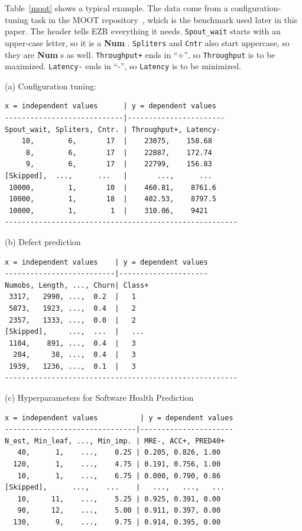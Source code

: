 \documentclass[AMA,STIX2COL]{WileyNJDv5}
\newcommand{\IT}{{\sffamily EZR}}
\newcommand{\cls}[1]{%
  \setlength{\fboxsep}{1.5pt}%
  \colorbox{clsbg}{\sffamily\bfseries{#1}}%
}
\begin{document}
Table~\ref{moot} shows a typical example. The data come from a
configuration-tuning task in the MOOT
repository~\cite{menzies2025moot}, which is the benchmark used
later in this paper. The header tells \IT{} everything it
needs. \texttt{Spout\_wait} starts with an upper-case letter,
so it is a \cls{Num}. \texttt{Spliters} and \texttt{Cntr} also
start uppercase, so they are \cls{Num}s as well.
\texttt{Throughput+} ends in ``+'', so \texttt{Throughput} is to
be maximized. \texttt{Latency-} ends in ``-'', so
\texttt{Latency} is to be minimized.

\begin{table}[!t]
\caption{An example MOOT data set: configuration tuning for a
distributed stream-processing system. Numeric column names
start with an upper-case letter. Goal column names end with
``+'' (maximize) or ``-'' (minimize). Everything else is an
independent attribute.}
\label{moot}
\begin{center}
\begin{minipage}{3in}
\normalsize{(a) Configuration tuning:}
{\fontsize{6pt}{7.2pt}\selectfont

\begin{verbatim}
x = independent values      | y = dependent values
----------------------------|-----------------------
Spout_wait, Spliters, Cntr. | Throughput+, Latency-
    10,        6,       17  |    23075,    158.68
     8,        6,       17  |    22887,    172.74
     9,        6,       17  |    22799,    156.83
[Skipped],  ...,      ...   |       ...,      ...
 10000,        1,       10  |    460.81,    8761.6
 10000,        1,       18  |    402.53,    8797.5
 10000,        1,        1  |    310.06,    9421
-------------------------------------------------------
\end{verbatim}}
\normalsize{(b) Defect prediction}
{\fontsize{6pt}{7.2pt}\selectfont
\begin{verbatim}
x = independent values    | y = dependent values
--------------------------|---------------------
Numobs, Length, ..., Churn| Class+
 3317,   2990, ...,  0.2  |   1
 5873,   1923, ...,  0.4  |   2
 2357,   1333, ...,  0.0  |   2
[Skipped],     ...,  ...  |   ...
 1104,    891, ...,  0.4  |   3
  204,     38, ...,  0.4  |   3
 1939,   1236, ...,  0.1  |   3
-------------------------------------------------------
\end{verbatim}}
\normalsize{(c) Hyperparameters for Software Health Prediction}
{\fontsize{6pt}{7.2pt}\selectfont
\begin{verbatim}
x = independent values          | y = dependent values
-------------------------------|----------------------
N_est, Min_leaf, ..., Min_imp. | MRE-, ACC+, PRED40+
   40,      1,    ...,    0.25 | 0.205, 0.826, 1.00
  120,      1,    ...,    4.75 | 0.191, 0.756, 1.00
   10,      1,    ...,    6.75 | 0.000, 0.790, 0.86
[Skipped],      ...,    ...    |   ...,   ...,   ...
   10,     11,    ...,    5.25 | 0.925, 0.391, 0.00
   90,     12,    ...,    5.00 | 0.911, 0.397, 0.00
  130,      9,    ...,    9.75 | 0.914, 0.395, 0.00
\end{verbatim}}
\end{minipage}
\end{center}
\end{table}
\end{document}
